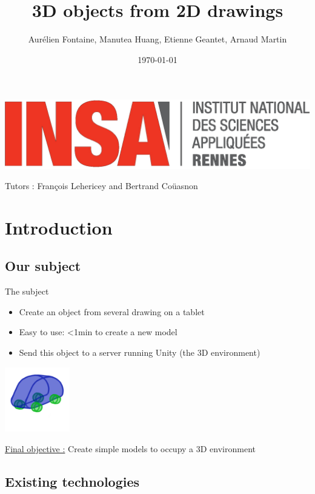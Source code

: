 \documentclass[a4paper,10pt]{beamer}
\title{3D objects from 2D drawings}
\author[Groupe 3INFO]{Aurélien Fontaine, Manutea Huang, Etienne Geantet, Arnaud Martin}
\institute[INSA de Rennes]{Institut National des Sciences Appliquées de Rennes}
\date{\today}
\begin{document}
	
	\begin{frame}
		\begin{titlepage}
			\centerline{\includegraphics[scale=0.1]{images/logos/logoINSA.jpg}}
			\centerline{Tutors : François Lehericey and Bertrand Coüasnon}	
		\end{titlepage}
	\end{frame}

	\section{Introduction}

		
		\subsection{Our subject}
		
		\begin{frame}{The subject}
			\begin{itemize}
				\item Create an object from several drawing on a tablet
				\item Easy to use: <1min to create a new model
				\item Send this object to a server running Unity (the 3D environment)
			\end{itemize}
			\centerline{\includegraphics[height=80pt]{images/modelcar.png}}              
			\underline{Final objective :} Create simple models to occupy a 3D environment
		\end{frame}
		
			
	\begin{frame}
		\tableofcontents
	\end{frame}
			
		\subsection{Existing technologies}
		
\end{document}
